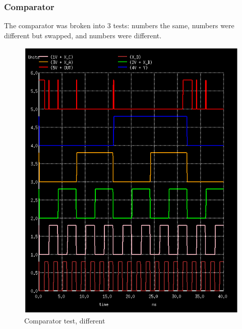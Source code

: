 \documentclass[12pt]{report}
\begin{document}
\subsubsection*{Comparator}
The comparator was broken into 3 tests: numbers the same, numbers were different but swapped, and numbers were different.
\begin{figure}[H]
  \centering
    \includegraphics[width=1.0\textwidth]{comparator_test_diff.PNG}
  \caption{Comparator test, different}
  \label{fig:comparator_test_diff}
\end{figure}
\end{document}
